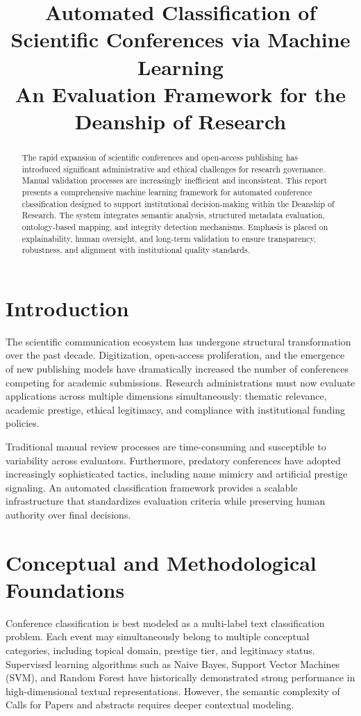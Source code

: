 \documentclass[11pt,a4paper]{article}
\title{\textbf{Automated Classification of Scientific Conferences via Machine Learning}\\
\large An Evaluation Framework for the Deanship of Research}
\author{}
\date{}
\begin{document}
\maketitle

\begin{abstract}
The rapid expansion of scientific conferences and open-access publishing has introduced
significant administrative and ethical challenges for research governance. Manual validation
processes are increasingly inefficient and inconsistent. This report presents a comprehensive
machine learning framework for automated conference classification designed to support
institutional decision-making within the Deanship of Research. The system integrates semantic
analysis, structured metadata evaluation, ontology-based mapping, and integrity detection
mechanisms. Emphasis is placed on explainability, human oversight, and long-term validation
to ensure transparency, robustness, and alignment with institutional quality standards.
\end{abstract}

\section{Introduction}

The scientific communication ecosystem has undergone structural transformation over the
past decade. Digitization, open-access proliferation, and the emergence of new publishing
models have dramatically increased the number of conferences competing for academic
submissions. Research administrations must now evaluate applications across multiple
dimensions simultaneously: thematic relevance, academic prestige, ethical legitimacy,
and compliance with institutional funding policies.

Traditional manual review processes are time-consuming and susceptible to variability
across evaluators. Furthermore, predatory conferences have adopted increasingly
sophisticated tactics, including name mimicry and artificial prestige signaling.
An automated classification framework provides a scalable infrastructure that standardizes
evaluation criteria while preserving human authority over final decisions.

\section{Conceptual and Methodological Foundations}

Conference classification is best modeled as a multi-label text classification problem.
Each event may simultaneously belong to multiple conceptual categories, including topical
domain, prestige tier, and legitimacy status. Supervised learning algorithms such as
Naive Bayes, Support Vector Machines (SVM), and Random Forest have historically
demonstrated strong performance in high-dimensional textual representations.
However, the semantic complexity of Calls for Papers and abstracts requires deeper
contextual modeling.
\end{document}
